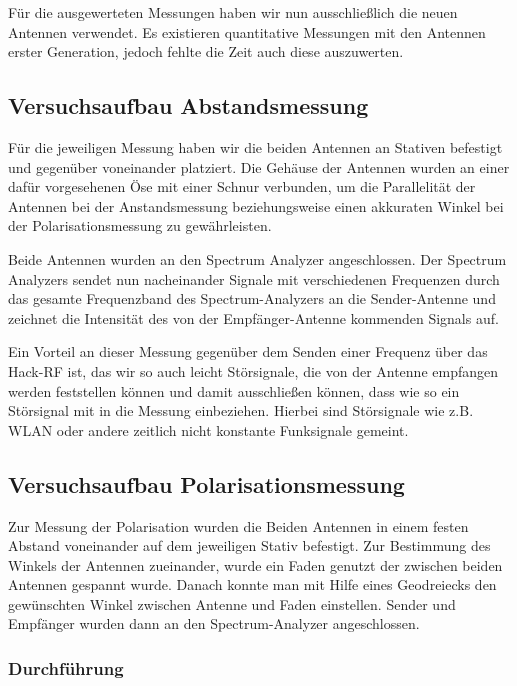 \documentclass[titlepage,11pt,a4paper,ngerman]{article}
\begin{document}
Für die ausgewerteten Messungen haben wir nun ausschließlich die neuen Antennen verwendet. Es existieren quantitative Messungen mit den Antennen erster Generation, jedoch fehlte die Zeit auch diese auszuwerten.

\subsection{Versuchsaufbau Abstandsmessung}

Für die jeweiligen Messung haben wir die beiden Antennen an Stativen befestigt und gegenüber voneinander platziert. Die Gehäuse der Antennen wurden an einer dafür vorgesehenen Öse mit einer Schnur verbunden, um die Parallelität der Antennen bei der Anstandsmessung beziehungsweise einen akkuraten Winkel bei der Polarisationsmessung zu gewährleisten.\par
Beide Antennen wurden an den Spectrum Analyzer angeschlossen. Der Spectrum Analyzers sendet nun nacheinander Signale mit verschiedenen Frequenzen durch das gesamte Frequenzband des Spectrum-Analyzers an die Sender-Antenne und zeichnet die Intensität des von der Empfänger-Antenne kommenden Signals auf.\par
Ein Vorteil an dieser Messung gegenüber dem Senden einer Frequenz über das Hack-RF ist, das wir so auch leicht Störsignale, die von der Antenne empfangen werden feststellen können und damit ausschließen können, dass wie so ein Störsignal mit in die Messung einbeziehen. Hierbei sind Störsignale wie z.B. WLAN oder andere zeitlich nicht konstante Funksignale gemeint.

\subsection{Versuchsaufbau Polarisationsmessung}

Zur Messung der Polarisation wurden die Beiden Antennen in einem festen Abstand voneinander auf dem jeweiligen Stativ befestigt. Zur Bestimmung des Winkels der Antennen zueinander, wurde ein Faden genutzt der zwischen beiden Antennen gespannt wurde. Danach konnte man mit Hilfe eines Geodreiecks den gewünschten Winkel zwischen Antenne und Faden einstellen. Sender und Empfänger wurden dann an den Spectrum-Analyzer angeschlossen.

\subsubsection{Durchführung}
\end{document}
